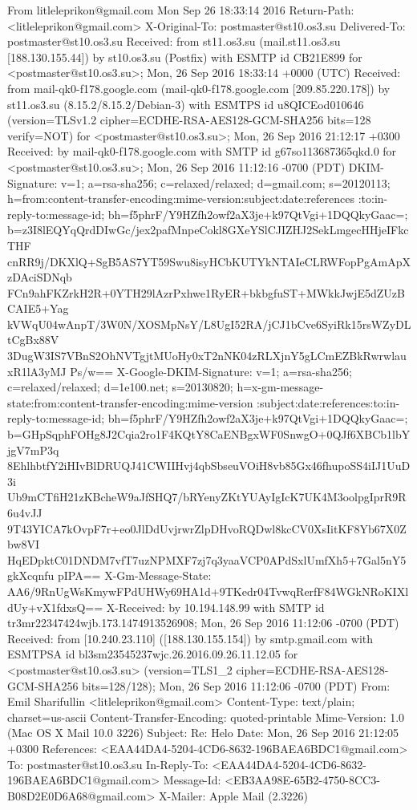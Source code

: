 \documentclass[a4paper,11pt]{article}
\begin{document}
\begin{bashcode}

From litleleprikon@gmail.com  Mon Sep 26 18:33:14 2016
Return-Path: <litleleprikon@gmail.com>
X-Original-To: postmaster@st10.os3.su
Delivered-To: postmaster@st10.os3.su
Received: from st11.os3.su (mail.st11.os3.su [188.130.155.44])
    by st10.os3.su (Postfix) with ESMTP id CB21E899
    for <postmaster@st10.os3.su>; Mon, 26 Sep 2016 18:33:14 +0000 (UTC)
Received: from mail-qk0-f178.google.com (mail-qk0-f178.google.com [209.85.220.178])
    by st11.os3.su (8.15.2/8.15.2/Debian-3) with ESMTPS id u8QICEod010646
    (version=TLSv1.2 cipher=ECDHE-RSA-AES128-GCM-SHA256 bits=128 verify=NOT)
    for <postmaster@st10.os3.su>; Mon, 26 Sep 2016 21:12:17 +0300
Received: by mail-qk0-f178.google.com with SMTP id g67so113687365qkd.0
        for <postmaster@st10.os3.su>; Mon, 26 Sep 2016 11:12:16 -0700 (PDT)
DKIM-Signature: v=1; a=rsa-sha256; c=relaxed/relaxed;
        d=gmail.com; s=20120113;
        h=from:content-transfer-encoding:mime-version:subject:date:references
         :to:in-reply-to:message-id;
        bh=f5phrF/Y9HZfh2owf2aX3je+k97QtVgi+1DQQkyGaac=;
        b=z3I8lEQYqQrdDIwGc/jex2pafMnpeCokl8GXeYSlCJIZHJ2SekLmgecHHjeIFkcTHF
         cnRR9j/DKXlQ+SgB5AS7YT59Swu8isyHCbKUTYkNTAIeCLRWFopPgAmApXzDAciSDNqb
         FCn9ahFKZrkH2R+0YTH29lAzrPxhwe1RyER+bkbgfuST+MWkkJwjE5dZUzBCAIE5+Yag
         kVWqU04wAnpT/3W0N/XOSMpNsY/L8UgI52RA/jCJ1bCve6SyiRk15rsWZyDLtCgBx88V
         3DugW3IS7VBnS2OhNVTgjtMUoHy0xT2nNK04zRLXjnY5gLCmEZBkRwrwlauxR1lA3yMJ
         Ps/w==
X-Google-DKIM-Signature: v=1; a=rsa-sha256; c=relaxed/relaxed;
        d=1e100.net; s=20130820;
        h=x-gm-message-state:from:content-transfer-encoding:mime-version
         :subject:date:references:to:in-reply-to:message-id;
        bh=f5phrF/Y9HZfh2owf2aX3je+k97QtVgi+1DQQkyGaac=;
        b=GHpSqphFOHg8J2Cqia2ro1F4KQtY8CaENBgxWF0SnwgO+0QJf6XBCb1lbYjgV7mP3q
         8EhlhbtfY2iHIvBlDRUQJ41CWIIHvj4qbSbseuVOiH8vb85Gx46fhupoSS4iIJ1UuD3i
         Ub9mCTfiH21zKBcheW9aJfSHQ7/bRYenyZKtYUAyIgIcK7UK4M3oolpgIprR9R6u4vJJ
         9T43YICA7kOvpF7r+eo0JlDdUvjrwrZlpDHvoRQDwl8kcCV0XsIitKF8Yb67X0Zbw8VI
         HqEDpktC01DNDM7vfT7uzNPMXF7zj7q3yaaVCP0APdSxlUmfXh5+7Gal5nY5gkXcqnfu
         pIPA==
X-Gm-Message-State: AA6/9RnUgWsKmywFPdUHWy69HA1d+9TKedr04TvwqRerfF84WGkNRoKIXldUy+vX1fdxsQ==
X-Received: by 10.194.148.99 with SMTP id tr3mr22347424wjb.173.1474913526908;
        Mon, 26 Sep 2016 11:12:06 -0700 (PDT)
Received: from [10.240.23.110] ([188.130.155.154])
        by smtp.gmail.com with ESMTPSA id bl3sm23545237wjc.26.2016.09.26.11.12.05
        for <postmaster@st10.os3.su>
        (version=TLS1_2 cipher=ECDHE-RSA-AES128-GCM-SHA256 bits=128/128);
        Mon, 26 Sep 2016 11:12:06 -0700 (PDT)
From: Emil Sharifullin <litleleprikon@gmail.com>
Content-Type: text/plain; charset=us-ascii
Content-Transfer-Encoding: quoted-printable
Mime-Version: 1.0 (Mac OS X Mail 10.0 \(3226\))
Subject: Re: Helo
Date: Mon, 26 Sep 2016 21:12:05 +0300
References: <EAA44DA4-5204-4CD6-8632-196BAEA6BDC1@gmail.com>
To: postmaster@st10.os3.su
In-Reply-To: <EAA44DA4-5204-4CD6-8632-196BAEA6BDC1@gmail.com>
Message-Id: <EB3AA98E-65B2-4750-8CC3-B08D2E0D6A68@gmail.com>
X-Mailer: Apple Mail (2.3226)


\end{bashcode}
\end{document}
